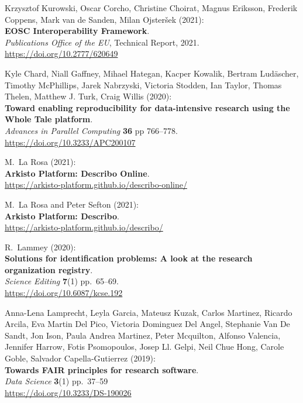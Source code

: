 \begin{thebibliography}{9}
Krzysztof Kurowski, Oscar Corcho, Christine Choirat, Magnus
Eriksson, Frederik Coppens, Mark van de Sanden, Milan Ojsteršek
(2021):\\
\textbf{EOSC Interoperability Framework}.\\
\emph{Publications Office of the EU}, Technical Report, 2021.\\
\url{https://doi.org/10.2777/620649}

Kyle Chard, Niall Gaffney, Mihael Hategan, Kacper Kowalik,
Bertram Ludäscher, Timothy McPhillips, Jarek Nabrzyski, Victoria
Stodden, Ian Taylor, Thomas Thelen, Matthew J. Turk, Craig Willis
(2020):\\
\textbf{Toward enabling reproducibility for data-intensive research
using the Whole Tale platform}.\\
\emph{Advances in Parallel Computing} \textbf{36} pp 766--778.\\
\url{https://doi.org/10.3233/APC200107}

M.~La Rosa (2021):\\
\textbf{Arkisto Platform: Describo Online}.\\
\url{https://arkisto-platform.github.io/describo-online/}

M.~La Rosa and Peter Sefton (2021):\\
\textbf{Arkisto Platform: Describo}.\\
\url{https://arkisto-platform.github.io/describo/}

R.~Lammey (2020):\\
\textbf{Solutions for identification problems: A look at the research
organization registry}.\\
\emph{Science Editing} \textbf{7}(1) pp.~65--69.\\
\url{https://doi.org/10.6087/kcse.192}

Anna-Lena Lamprecht, Leyla Garcia, Mateusz Kuzak, Carlos
Martinez, Ricardo Arcila, Eva Martin Del Pico, Victoria Dominguez Del
Angel, Stephanie Van De Sandt, Jon Ison, Paula Andrea Martinez, Peter
Mcquilton, Alfonso Valencia, Jennifer Harrow, Fotis Psomopoulos, Josep
Ll. Gelpi, Neil Chue Hong, Carole Goble, Salvador Capella-Gutierrez
(2019):\\
\textbf{Towards FAIR principles for research software}.\\
\emph{Data Science} \textbf{3}(1) pp.~37--59\\
\url{https://doi.org/10.3233/DS-190026}


\end{thebibliography}
